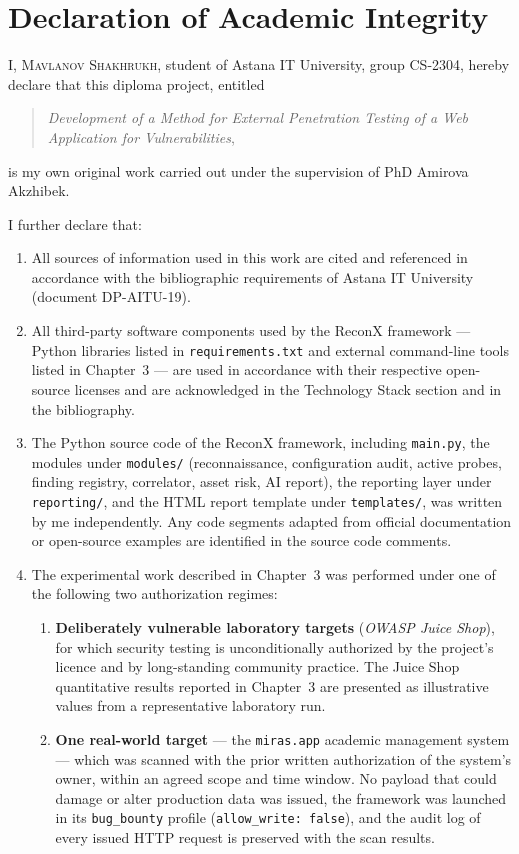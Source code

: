 \chapter{Declaration of Academic Integrity}
\begin{SingleSpace}
I, \textsc{Mavlanov Shakhrukh}, student of Astana IT University, group CS-2304, hereby declare that this diploma project, entitled
\begin{quote}
\textit{Development of a Method for External Penetration Testing of a Web Application for Vulnerabilities},
\end{quote}
is my own original work carried out under the supervision of PhD Amirova Akzhibek.

I further declare that:
\begin{enumerate}
  \item All sources of information used in this work are cited and referenced in accordance with the bibliographic requirements of Astana IT University (document DP-AITU-19).
  \item All third-party software components used by the ReconX framework --- Python libraries listed in \texttt{requirements.txt} and external command-line tools listed in Chapter~3 --- are used in accordance with their respective open-source licenses and are acknowledged in the Technology Stack section and in the bibliography.
  \item The Python source code of the ReconX framework, including \texttt{main.py}, the modules under \texttt{modules/} (reconnaissance, configuration audit, active probes, finding registry, correlator, asset risk, AI report), the reporting layer under \texttt{reporting/}, and the HTML report template under \texttt{templates/}, was written by me independently. Any code segments adapted from official documentation or open-source examples are identified in the source code comments.
  \item The experimental work described in Chapter~3 was performed under one of the following two authorization regimes:
  \begin{enumerate}
    \item \textbf{Deliberately vulnerable laboratory targets} (\textit{OWASP Juice Shop}), for which security testing is unconditionally authorized by the project's licence and by long-standing community practice. The Juice Shop quantitative results reported in Chapter~3 are presented as illustrative values from a representative laboratory run.
    \item \textbf{One real-world target} --- the \texttt{miras.app} academic management system --- which was scanned with the prior written authorization of the system's owner, within an agreed scope and time window. No payload that could damage or alter production data was issued, the framework was launched in its \texttt{bug\_bounty} profile (\texttt{allow\_write: false}), and the audit log of every issued HTTP request is preserved with the scan results.

\end{enumerate}
\end{enumerate}
\end{SingleSpace}
